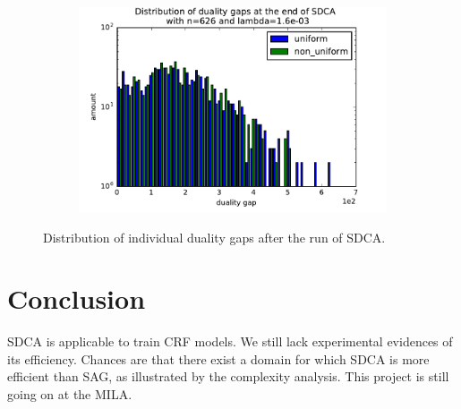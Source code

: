 \documentclass{article}
\DeclareMathOperator{\1}{\mathbb{1}}
\begin{document}
\begin{figure}[ht]
\begin{subfigure}[t]{0.3\textwidth}
    \end{subfigure}
    ~
    \begin{subfigure}[t]{0.3\textwidth}
        \centering
        \includegraphics[width=\textwidth]{images/20170914_040725_ocr_optdualgaps.pdf}
    \end{subfigure}
    \caption{Distribution of individual duality gaps after the run of SDCA.}
	\label{ocr duality gaps}
\end{figure}


\section*{Conclusion}

SDCA is applicable to train CRF models. 
We still lack experimental evidences of its efficiency.
Chances are that there exist a domain for which SDCA is more efficient than SAG, as illustrated by the complexity analysis.
This project is still going on at the MILA.




\end{document}
